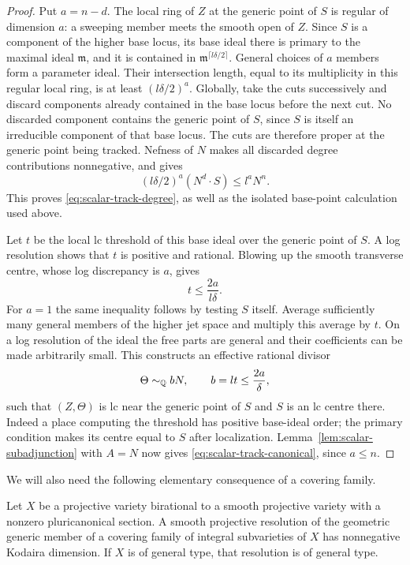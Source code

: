 \begin{proof}
Put $a=n-d$.  The local ring of $Z$ at the generic point of $S$ is
regular of dimension $a$: a sweeping member meets the smooth open of
$Z$.  Since $S$ is a component of the higher base locus, its base
ideal there is primary to the maximal ideal $\mathfrak m$, and it is
contained in $\mathfrak m^{\lceil l\delta/2\rceil}$.  General choices
of $a$ members form a parameter ideal.  Their intersection length,
equal to its multiplicity in this regular local ring, is at least
$(l\delta/2)^a$.  Globally, take the cuts successively and discard
components already contained in the base locus before the next cut.
No discarded component contains the generic point of $S$, since $S$
is itself an irreducible component of that base locus.  The cuts are
therefore proper at the generic point being tracked.  Nefness of $N$
makes all discarded degree contributions nonnegative, and gives
\[
 (l\delta/2)^a(N^d\cdot S)\le l^aN^n.
\]
This proves \eqref{eq:scalar-track-degree}, as well as the isolated
base-point calculation used above.

Let $t$ be the local lc threshold of this base ideal over the generic
point of $S$.  A log resolution shows that $t$ is positive and rational.
Blowing up the smooth transverse centre, whose log discrepancy is
$a$, gives
\[
 t\le\frac{2a}{l\delta}.
\]
For $a=1$ the same inequality follows by testing $S$ itself.  Average
sufficiently many general members of the higher jet space and
multiply this average by $t$.  On a log resolution of the ideal the
free parts are general and their coefficients can be made arbitrarily
small.  This constructs an effective rational divisor
\[
 \Theta\sim_{\mathbb Q}bN,
 \qquad b=lt\le\frac{2a}{\delta},
\]
such that $(Z,\Theta)$ is lc near the generic point of $S$ and $S$ is
an lc centre there.  Indeed a place computing the threshold has
positive base-ideal order; the primary condition makes its centre
equal to $S$ after localization.  Lemma~\ref{lem:scalar-subadjunction}
with $A=N$ now gives \eqref{eq:scalar-track-canonical}, since $a\le n$.
\end{proof}

We will also need the following elementary consequence of a covering
family.

\begin{lemma}
\label{lem:scalar-covering}
Let $X$ be a projective variety birational to a smooth projective
variety with a nonzero pluricanonical section.  A smooth projective
resolution of the geometric generic member of a covering family of
integral subvarieties of $X$ has nonnegative Kodaira dimension.  If
$X$ is of general type, that resolution is of general type.
\end{lemma}

